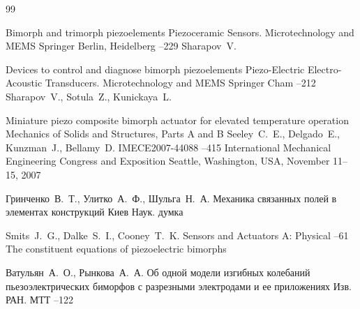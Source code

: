 
\vspace{-3mm}


\begin{thebibliography}{99}

\paper  Bimorph and trimorph piezoelements
\inbook  Piezoceramic Sensors. Microtechnology and MEMS
\publ Springer
\publaddr Berlin, Heidelberg
--229
\by Sharapov~V.

\paper  Devices to control and diagnose bimorph piezoelements
\inbook  Piezo-Electric Electro-Acoustic Transducers. Microtechnology and MEMS
\publ Springer
\publaddr Cham
--212
\by Sharapov~V., Sotula~Z., Kunickaya~L.


\paper  Miniature piezo composite bimorph actuator for elevated temperature operation
\volinfo Mechanics of Solids and Structures, Parts A and B
\by Seeley~C.~E., Delgado~E., Kunzman~J., Bellamy~D.
\papernumber IMECE2007-44088
--415
\inbook International Mechanical Engineering Congress and Exposition
\procinfo Seattle, Washington, USA, November 11–15, 2007



\by Гринченко~В.~Т., Улитко~А.~Ф., Шульга~Н.~А.
\book Механика связанных полей в элементах конструкций
\publaddr Киев
\publ Наук. думка

\by Smits~J.~G., Dalke~S.~I., Cooney~T.~K.
\jour Sensors and Actuators A: Physical
--61
\paper The constituent equations of piezoelectric bimorphs

\by Ватульян~А.~О., Рынкова~А.~А.
\paper Об одной модели изгибных колебаний пьезоэлектрических биморфов с разрезными электродами и ее приложениях
\jour Изв. РАН. МТТ
--122


\end{thebibliography}
